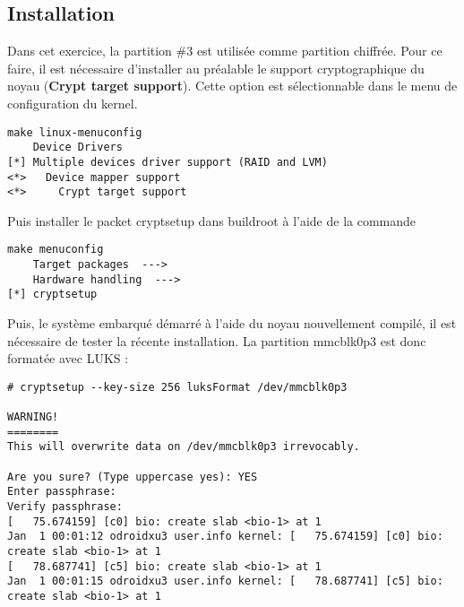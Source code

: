 \subsection{Installation}
Dans cet exercice, la partition \#3 est utilisée comme partition chiffrée. Pour ce faire, il est nécessaire d'installer au préalable le support cryptographique du noyau (\textbf{Crypt target support}). Cette option est sélectionnable dans le menu de configuration du kernel.
\begin{lstlisting}[style=Bash]
make linux-menuconfig
    Device Drivers
[*] Multiple devices driver support (RAID and LVM)
<*>   Device mapper support
<*>     Crypt target support
\end{lstlisting}
Puis installer le packet cryptsetup dans buildroot à l'aide de la commande
\begin{lstlisting}[style=Bash]
make menuconfig
    Target packages  --->
    Hardware handling  --->
[*] cryptsetup
\end{lstlisting}

Puis, le système embarqué démarré à l'aide du noyau nouvellement compilé, il est nécessaire de tester la récente installation. La partition mmcblk0p3 est donc formatée avec LUKS :
\begin{lstlisting}
# cryptsetup --key-size 256 luksFormat /dev/mmcblk0p3

WARNING!
========
This will overwrite data on /dev/mmcblk0p3 irrevocably.

Are you sure? (Type uppercase yes): YES
Enter passphrase: 
Verify passphrase: 
[   75.674159] [c0] bio: create slab <bio-1> at 1
Jan  1 00:01:12 odroidxu3 user.info kernel: [   75.674159] [c0] bio: create slab <bio-1> at 1
[   78.687741] [c5] bio: create slab <bio-1> at 1
Jan  1 00:01:15 odroidxu3 user.info kernel: [   78.687741] [c5] bio: create slab <bio-1> at 1
\end{lstlisting}

